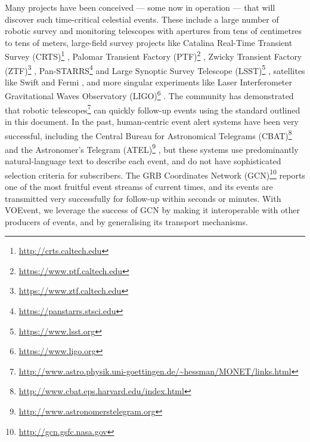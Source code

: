 \documentclass[11pt,a4paper]{ivoa}
\begin{document}
Many projects have been conceived --- some now in operation --- that will discover such time-critical celestial events. These include a large number of robotic survey and monitoring telescopes with apertures from tens of centimetres to tens of meters, large-field survey projects like Catalina Real-Time Transient Survey (CRTS)\footnote{\url{http://crts.caltech.edu}} \citep{bib08}, Palomar Transient Factory (PTF)\footnote{\url{https://www.ptf.caltech.edu}} \citep{bib31}, Zwicky Transient Factory (ZTF)\footnote{\url{https://www.ztf.caltech.edu}} \citep{2014htu..conf...27B}, Pan-STARRS\footnote{\url{https://panstarrs.stsci.edu}} \citep{bib09} and Large Synoptic Survey Telescope (LSST)\footnote{\url{https://www.lsst.org}} \citep{bib07}, satellites like Swift \citep{bib11a} and Fermi \citep{bib11b}, and more singular experiments like Laser Interferometer Gravitational Waves Observatory (LIGO)\footnote{\url{https://www.ligo.org}} \citep{bib06}. The community has demonstrated that robotic telescopes\footnote{\url{http://www.astro.physik.uni-goettingen.de/~hessman/MONET/links.html}} can quickly follow-up events using the standard outlined in this document. In the past, human-centric event alert systems have been very successful, including the Central Bureau for Astronomical Telegrams (CBAT)\footnote{\url{http://www.cbat.eps.harvard.edu/index.html}} and the Astronomer's Telegram (ATEL)\footnote{\url{http://www.astronomerstelegram.org}} \citep{bib01}, but these systems use predominantly natural-language text to describe each event, and do not have sophisticated selection criteria for subscribers. The GRB Coordinates Network (GCN)\footnote{\url{http://gcn.gsfc.nasa.gov}} \citep{bib04} reports one of the most fruitful event streams of current times, and its events are transmitted very successfully for follow-up within seconds or minutes. With VOEvent, we leverage the success of GCN by making it interoperable with other producers of events, and by generalising its transport mechanisms. 
\end{document}
